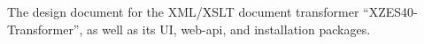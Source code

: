 The design document for the XML/XSLT document transformer ``XZES40-Transformer'', as well as its UI, web-api, and installation packages.
